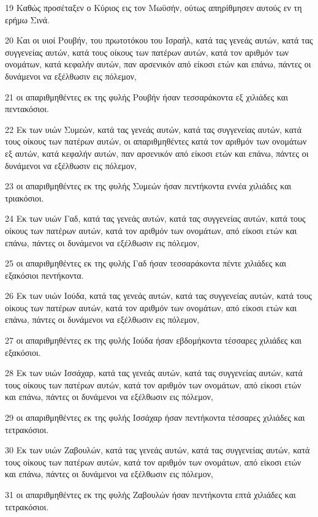 \par 19 Καθώς προσέταξεν ο Κύριος εις τον Μωϋσήν, ούτως απηρίθμησεν αυτούς εν τη ερήμω Σινά.
\par 20 Και οι υιοί Ρουβήν, του πρωτοτόκου του Ισραήλ, κατά τας γενεάς αυτών, κατά τας συγγενείας αυτών, κατά τους οίκους των πατέρων αυτών, κατά τον αριθμόν των ονομάτων, κατά κεφαλήν αυτών, παν αρσενικόν από είκοσι ετών και επάνω, πάντες οι δυνάμενοι να εξέλθωσιν εις πόλεμον,
\par 21 οι απαριθμηθέντες εκ της φυλής Ρουβήν ήσαν τεσσαράκοντα εξ χιλιάδες και πεντακόσιοι.
\par 22 Εκ των υιών Συμεών, κατά τας γενεάς αυτών, κατά τας συγγενείας αυτών, κατά τους οίκους των πατέρων αυτών, οι απαριθμηθέντες κατά τον αριθμόν των ονομάτων εξ αυτών, κατά κεφαλήν αυτών, παν αρσενικόν από είκοσι ετών και επάνω, πάντες οι δυνάμενοι να εξέλθωσιν εις πόλεμον,
\par 23 οι απαριθμηθέντες εκ της φυλής Συμεών ήσαν πεντήκοντα εννέα χιλιάδες και τριακόσιοι.
\par 24 Εκ των υιών Γαδ, κατά τας γενεάς αυτών, κατά τας συγγενείας αυτών, κατά τους οίκους των πατέρων αυτών, κατά τον αριθμόν των ονομάτων, από είκοσι ετών και επάνω, πάντες οι δυνάμενοι να εξέλθωσιν εις πόλεμον,
\par 25 οι απαριθμηθέντες εκ της φυλής Γαδ ήσαν τεσσαράκοντα πέντε χιλιάδες και εξακόσιοι πεντήκοντα.
\par 26 Εκ των υιών Ιούδα, κατά τας γενεάς αυτών, κατά τας συγγενείας αυτών, κατά τους οίκους των πατέρων αυτών, κατά τον αριθμόν των ονομάτων, από είκοσι ετών και επάνω, πάντες οι δυνάμενοι να εξέλθωσιν εις πόλεμον,
\par 27 οι απαριθμηθέντες εκ της φυλής Ιούδα ήσαν εβδομήκοντα τέσσαρες χιλιάδες και εξακόσιοι.
\par 28 Εκ των υιών Ισσάχαρ, κατά τας γενεάς αυτών, κατά τας συγγενείας αυτών, κατά τους οίκους των πατέρων αυτών, κατά τον αριθμόν των ονομάτων, από είκοσι ετών και επάνω, πάντες οι δυνάμενοι να εξέλθωσιν εις πόλεμον,
\par 29 οι απαριθμηθέντες εκ της φυλής Ισσάχαρ ήσαν πεντήκοντα τέσσαρες χιλιάδες και τετρακόσιοι.
\par 30 Εκ των υιών Ζαβουλών, κατά τας γενεάς αυτών, κατά τας συγγενείας αυτών, κατά τους οίκους των πατέρων αυτών, κατά τον αριθμόν των ονομάτων, από είκοσι ετών και επάνω, πάντες οι δυνάμενοι να εξέλθωσιν εις πόλεμον,
\par 31 οι απαριθμηθέντες εκ της φυλής Ζαβουλών ήσαν πεντήκοντα επτά χιλιάδες και τετρακόσιοι.
